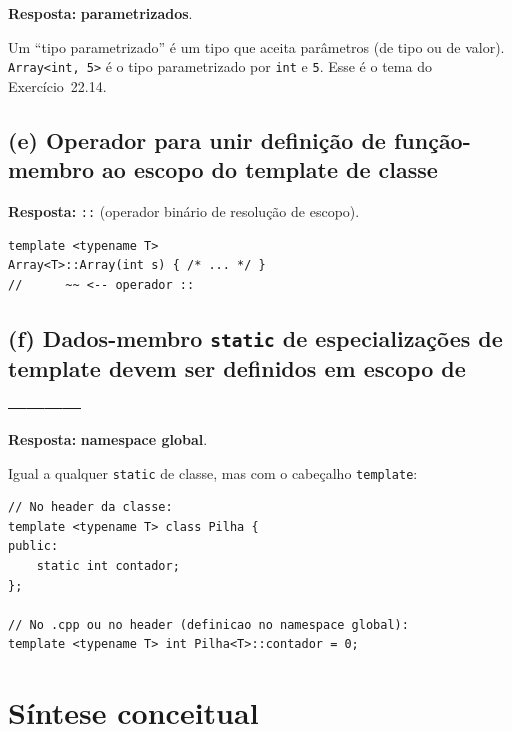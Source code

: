 \documentclass[11pt,a4paper]{article}
\begin{document}
\begin{resposta}\textbf{Resposta:} \textbf{parametrizados}.\end{resposta}

Um ``tipo parametrizado'' \'e um tipo que aceita par\^ametros (de tipo ou de valor). \texttt{Array<int, 5>} \'e o tipo parametrizado por \texttt{int} e \texttt{5}. Esse \'e o tema do Exerc\'icio~22.14.

\subsection*{(e) Operador para unir defini\c{c}\~ao de fun\c{c}\~ao-membro ao escopo do template de classe}

\begin{resposta}\textbf{Resposta:} \texttt{::} (operador bin\'ario de resolu\c{c}\~ao de escopo).\end{resposta}

\begin{lstlisting}[style=cppcode,numbers=none]
template <typename T>
Array<T>::Array(int s) { /* ... */ }
//      ~~ <-- operador ::
\end{lstlisting}

\subsection*{(f) Dados-membro \texttt{static} de especializa\c{c}\~oes de template devem ser definidos em escopo de \_\_\_\_}

\begin{resposta}\textbf{Resposta:} \textbf{namespace global}.\end{resposta}

Igual a qualquer \texttt{static} de classe, mas com o cabe\c{c}alho \texttt{template}:

\begin{lstlisting}[style=cppcode,numbers=none]
// No header da classe:
template <typename T> class Pilha {
public:
    static int contador;
};

// No .cpp ou no header (definicao no namespace global):
template <typename T> int Pilha<T>::contador = 0;
\end{lstlisting}

\section*{S\'intese conceitual}
\end{document}
